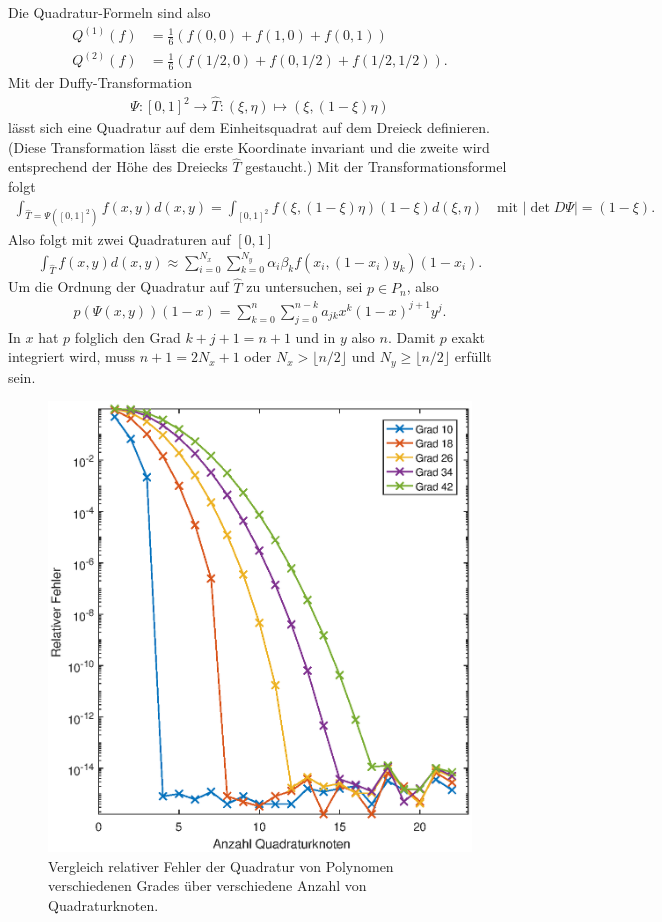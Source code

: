 \documentclass[french, 12pt, a4paper, onesided]{scrartcl}
\theoremstyle{plain}
\theoremstyle{definition}
\theoremstyle{remark}
\begin{document}
Die Quadratur-Formeln sind also
\begin{align}
	Q^{(1)}(f) &= \frac{1}{6}\left( f(0,0)+f(1,0)+f(0,1) \right) \\
	Q^{(2)}(f) &= \frac{1}{6}\left(  f(1/2,0)+f(0,1/2)+f(1/2,1/2) \right). 
\end{align}
Mit der Duffy-Transformation
\begin{align*}
	\Psi:[0,1]^2\rightarrow \hat{T}: (\xi,\eta)\mapsto (\xi,(1-\xi)\eta)
\end{align*} 
lässt sich eine Quadratur auf dem Einheitsquadrat auf dem Dreieck definieren. (Diese Transformation lässt die erste Koordinate invariant und die zweite wird entsprechend der Höhe des Dreiecks $ \hat{T} $ gestaucht.) Mit der Transformationsformel folgt
\begin{align*}
	\int_{\hat{T}=\Psi([0,1]^2)}f(x,y)d(x,y) = \int_{[0,1]^2}f(\xi,(1-\xi)\eta)(1-\xi)d(\xi,\eta) \quad \text{mit } |\det D\Psi|=(1-\xi).
\end{align*}
Also folgt mit zwei Quadraturen auf $ [0,1] $
\begin{align*}
	\int_{\hat{T}}f(x,y)d(x,y) \approx \sum_{i=0}^{N_x}\sum_{k=0}^{N_y}\alpha_i\beta_kf(x_i,(1-x_i)y_k)(1-x_i).
\end{align*}
Um die Ordnung der Quadratur auf $ \hat{T} $ zu untersuchen, sei $ p\in P_n $, also
\begin{align*}
	p(\Psi(x,y))(1-x)=\sum_{k=0}^{n}\sum_{j=0}^{n-k}a_{jk}x^k(1-x)^{j+1}y^j.
\end{align*}
In $ x $ hat $ p $ folglich den Grad $ k+j+1=n+1 $ und in $ y $ also $ n $. Damit $ p $ exakt integriert wird, muss $ n+1=2N_x+1 $ oder $ N_x> \lfloor n/2 \rfloor $ und $ N_y\geq\lfloor n/2 \rfloor $ erfüllt sein.

\begin{figure}[h]
	\centering
	\includegraphics[width=0.9\linewidth]{Rel-Fehler-1D.eps}
	\caption{Vergleich relativer Fehler der Quadratur von Polynomen verschiedenen Grades über verschiedene Anzahl von Quadraturknoten.}
	\label{fig:relError1D}
\end{figure}
\end{document}
